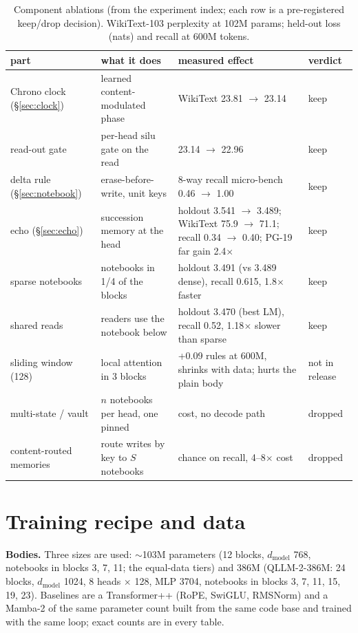 \documentclass[11pt]{article}
\newcommand{\model}{QLLM-2}
\newcommand{\tpp}{Transformer++}
\newcommand{\mamba}{Mamba-2}
\begin{document}
\begin{table}[t]
\centering\small
\caption{Component ablations (from the experiment index; each row is a pre-registered keep/drop decision). WikiText-103 perplexity at 102M params; held-out loss (nats) and recall at 600M tokens.}
\label{tab:ablation}
\begin{tabular}{llll}
\toprule
part & what it does & measured effect & verdict \\
\midrule
Chrono clock (\S\ref{sec:clock}) & learned content-modulated phase & WikiText 23.81 $\to$ 23.14 & keep \\
read-out gate & per-head $\mathrm{silu}$ gate on the read & 23.14 $\to$ 22.96 & keep \\
delta rule (\S\ref{sec:notebook}) & erase-before-write, unit keys & 8-way recall micro-bench 0.46 $\to$ 1.00 & keep \\
echo (\S\ref{sec:echo}) & succession memory at the head & holdout 3.541 $\to$ 3.489; WikiText 75.9 $\to$ 71.1; recall 0.34 $\to$ 0.40; PG-19 far gain 2.4$\times$ & keep \\
sparse notebooks & notebooks in 1/4 of the blocks & holdout 3.491 (vs 3.489 dense), recall 0.615, 1.8$\times$ faster & keep \\
shared reads & readers use the notebook below & holdout 3.470 (best LM), recall 0.52, 1.18$\times$ slower than sparse & keep \\
sliding window (128) & local attention in 3 blocks & +0.09 rules at 600M, shrinks with data; hurts the plain body & not in release \\
multi-state / vault & $n$ notebooks per head, one pinned & cost, no decode path & dropped \\
content-routed memories & route writes by key to $S$ notebooks & chance on recall, 4--8$\times$ cost & dropped \\
\bottomrule
\end{tabular}
\end{table}

\section{Training recipe and data}
\label{sec:recipe}
\textbf{Bodies.} Three sizes are used: $\sim$103M parameters (12 blocks, $d_{\text{model}}$ 768, notebooks in blocks 3, 7, 11; the equal-data tiers) and 386M (\model-386M: 24 blocks, $d_{\text{model}}$ 1024, 8 heads $\times$ 128, MLP 3704, notebooks in blocks 3, 7, 11, 15, 19, 23). Baselines are a \tpp{} (RoPE, SwiGLU, RMSNorm) and a \mamba{} of the same parameter count built from the same code base and trained with the same loop; exact counts are in every table.
\end{document}
